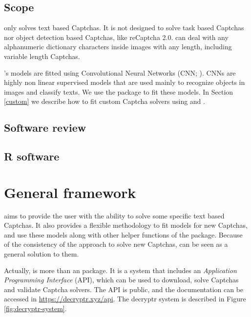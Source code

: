 \documentclass[article,nojss]{jss}
\begin{document}
\hypertarget{scope}{%
\subsection{Scope}\label{scope}}

 only solves text based Captchas. It is not designed to
solve task based Captchas nor object detection based Captchas, like
reCaptcha 2.0.  can deal with any alphanumeric dictionary
characters inside images with any length, including variable length
Captchas.

's models are fitted using Convolutional Neural Networks
(CNN; \citealt{lecun1995convolutional}). CNNs are highly non linear
supervised models that are used mainly to recognize objects in images
and classify texts. We use the  package \citep{kerasjj} to
fit these models. In Section \ref{custom} we describe how to fit custom
Captcha solvers using  and .

\hypertarget{software-review}{%
\subsection{Software review}\label{software-review}}

\lipsum[2]

\hypertarget{r-software}{%
\subsection{R software}\label{r-software}}

\lipsum[2]

\hypertarget{framework}{%
\section{General framework}\label{framework}}

 aims to provide the  user with the ability to
solve some specific text based Captchas. It also provides a flexible
methodology to fit models for new Captchas, and use these models along
with other helper functions of the package. Because of the consistency
of the approach to solve new Captchas,  can be seen as a
general solution to them.

Actually,  is more than an  package. It is a
system that includes an \emph{Application Programming Interface} (API),
which can be used to download, solve Captchas and validate Captcha
solvers. The API is public, and the documentation can be accessed in
\url{https://decryptr.xyz/api}. The decryptr system is described in
Figure \ref{fig:decryptr-system}.
\end{document}
